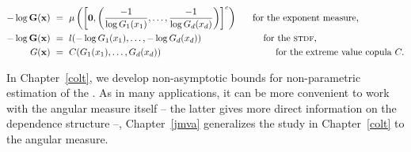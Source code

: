 \begin{align*}
- \log \mathbf G(\mathbf{x})~&=~ \mu\left( \left[ \mathbf 0, \left(\frac{-1}{\log G_1(x_1)}, \dots ,\frac{-1}{\log G_d(x_d)}\right)\right]^c\right) ~~~~~\text{for the exponent measure,}\\
 - \log \mathbf G(\mathbf x) ~&=~ l(-\log G_1(x_1), \ldots, -\log G_d(x_d)) ~~~~~~~~~~~~~~~~~~~~ \text{for the {\sc stdf},}\\
 G( \mathbf x) ~&=~ C(G_1(x_1), \ldots, G_d(x_d)) ~~~~~~~~~~~~~~~~~~~~~~~~~~~~~~~~~~~~~ \text{for the extreme value copula } C.
\end{align*}


In Chapter~\ref{colt}, we develop non-asymptotic bounds for non-parametric estimation of the \stdf.
As in many applications, it can be more convenient to work with the angular measure itself -- the latter gives more direct information on the dependence structure --, Chapter~\ref{jmva} generalizes the study in Chapter~\ref{colt} to the angular measure.




%


